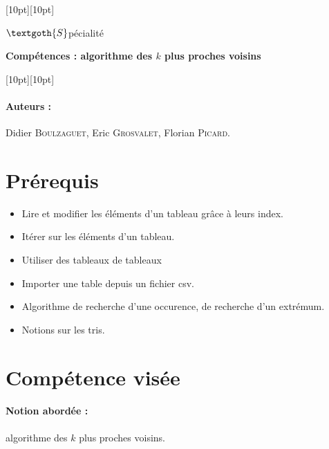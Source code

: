 \documentclass[12pt]{article}                   %
\theoremstyle{exercicestyle}
\theoremstyle{break2}
\theoremstyle{break3}
\begin{document}
\noindent\hrulefill
\raisebox{-2.1pt}[10pt][10pt]{\quad\decoone\quad}\hrulefill 

\hfill $\textgoth{S}$pécialité
 \begin{center}{\quad \large{\textbf{ Compétences : algorithme des $k$ plus proches voisins}}\; }\end{center}
\vspace{0.5cm}
\noindent
\hrulefill
\raisebox{-16.4pt}[10pt][10pt]{}\hrulefill

\paragraph{Auteurs :} Didier \textsc{Boulzaguet}, Eric \textsc{Grosvalet}, Florian \textsc{Picard}.

\section{Prérequis}

\begin{itemize}[label=\textbullet]
    \item Lire et modifier les éléments d'un tableau grâce à leurs index.
    \item Itérer sur les éléments d'un tableau.
    \item Utiliser des tableaux de tableaux
    \item Importer une table depuis un fichier csv. 
    \item Algorithme de recherche d'une occurence, de recherche d'un extrémum.
    \item Notions sur les tris.
\end{itemize}

\section{Compétence visée}

\paragraph{Notion abordée : } algorithme des $k$ plus proches voisins.
\end{document}
